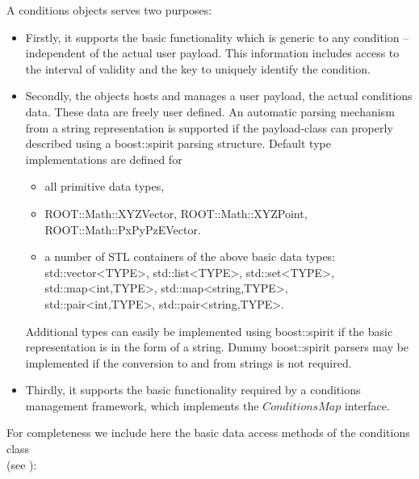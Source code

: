 \documentclass[10pt,a4paper]{article}
\begin{document}
\noindent
A conditions objects serves two purposes:
\begin{itemize}\itemcompact
\item Firstly, it supports the basic functionality which is generic to any 
      condition -- independent of the actual user payload. This information 
      includes access to the interval of validity and the key to uniquely identify
      the condition. 

\item Secondly, the objects hosts and manages a user payload, the actual
      conditions data. These data are freely user defined. An automatic 
      parsing mechanism from a string representation is supported if the 
      payload-class can properly described using a boost::spirit
      parsing structure. Default type implementations are defined for 
      \begin{itemize}\itemcompact
        \item all primitive data types, 
        \item ROOT::Math::XYZVector, ROOT::Math::XYZPoint, ROOT::Math::PxPyPzEVector.
        \item a number of STL containers of the above basic data types:\\
                std::vector\textless TYPE\textgreater, 
                std::list\textless TYPE\textgreater,
                std::set\textless TYPE\textgreater,\\
                std::map\textless int,TYPE\textgreater,
                std::map\textless string,TYPE\textgreater,\\
                std::pair\textless int,TYPE\textgreater,
                std::pair\textless string,TYPE\textgreater.
      \end{itemize}
      Additional types can easily be implemented using boost::spirit if the basic
      representation is in the form of a string. Dummy boost::spirit parsers 
      may be implemented if the conversion to and from strings is not required.
\item Thirdly, it supports the basic functionality required by a 
      conditions management framework, which implements the $ConditionsMap$ 
      interface.
\end{itemize}
For completeness we include here the basic data access methods of the conditions
class\\
(see ):
\vspace{-0.4cm}
\end{document}
